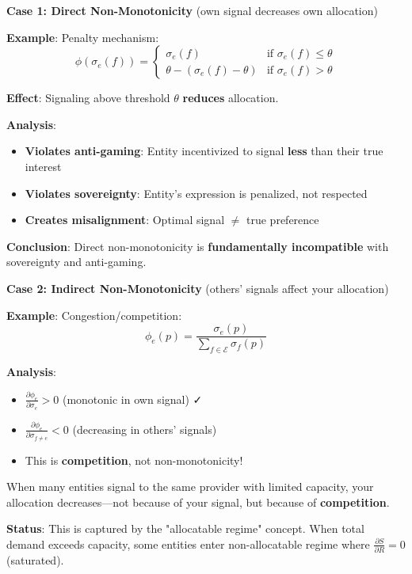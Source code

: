\documentclass[11pt,a4paper]{article}
\theoremstyle{definition}
\theoremstyle{remark}
\newcommand{\E}{\mathcal{E}}
\begin{document}
\textbf{Case 1: Direct Non-Monotonicity} (own signal decreases own allocation)

\textbf{Example}: Penalty mechanism:
\[ \phi(\sigma_e(f)) = \begin{cases}
\sigma_e(f) & \text{if } \sigma_e(f) \le \theta \\
\theta - (\sigma_e(f) - \theta) & \text{if } \sigma_e(f) > \theta
\end{cases} \]

\textbf{Effect}: Signaling above threshold $\theta$ \textbf{reduces} allocation.

\textbf{Analysis}:
\begin{itemize}
\item \textbf{Violates anti-gaming}: Entity incentivized to signal \textbf{less} than their true interest
\item \textbf{Violates sovereignty}: Entity's expression is penalized, not respected
\item \textbf{Creates misalignment}: Optimal signal $\ne$ true preference
\end{itemize}

\textbf{Conclusion}: Direct non-monotonicity is \textbf{fundamentally incompatible} with sovereignty and anti-gaming.

\medskip

\textbf{Case 2: Indirect Non-Monotonicity} (others' signals affect your allocation)

\textbf{Example}: Congestion/competition:
\[ \phi_e(p) = \frac{\sigma_e(p)}{\sum_{f \in \E} \sigma_f(p)} \]

\textbf{Analysis}:
\begin{itemize}
\item $\frac{\partial \phi_e}{\partial \sigma_e} > 0$ (monotonic in own signal) ✓
\item $\frac{\partial \phi_e}{\partial \sigma_{f \ne e}} < 0$ (decreasing in others' signals)
\item This is \textbf{competition}, not non-monotonicity!
\end{itemize}

When many entities signal to the same provider with limited capacity, your allocation decreases—not because of your signal, but because of \textbf{competition}.

\textbf{Status}: This is captured by the "allocatable regime" concept. When total demand exceeds capacity, some entities enter non-allocatable regime where $\frac{\partial S}{\partial R} = 0$ (saturated).
\end{document}
